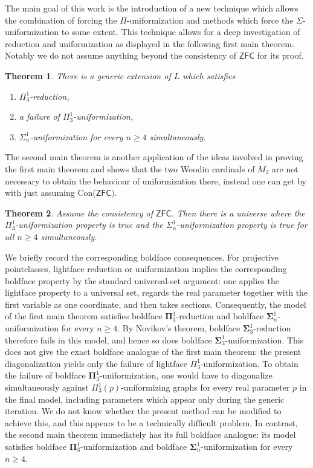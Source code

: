 \documentclass[a4paper,11pt]{article}
\newtheorem{theorem}{Theorem}[section]
\begin{document}
The main goal of this work is the introduction of a new technique which allows the combination of forcing the $\Pi$-uniformization and methods which force the $\Sigma$-uniformization to some extent. This technique allows for a deep investigation of reduction and uniformization as displayed in the following first main theorem. Notably we do not assume anything beyond the consistency of $\mathsf{ZFC}$ for its proof.


\begin{theorem}
There is a generic extension of $L$ which satisfies
\begin{enumerate}
\item $\Pi^1_3$-reduction,
\item a failure of $\Pi^1_3$-uniformization,
\item $\Sigma^1_n$-uniformization for every $n \ge 4$ simultaneously.
\end{enumerate}
\end{theorem}


The second main theorem is another application of the ideas involved in proving the first main theorem and shows that the two Woodin cardinals of $M_2$ are not necessary to obtain the behaviour of uniformization there, instead one can get by with just assuming Con($\mathsf{ZFC})$.


\begin{theorem}
Assume the consistency of $\mathsf{ZFC}$. Then there is a universe where the $\Pi^1_3$-uniformization property is true and the $\Sigma^1_n$-uniformization property is true for all $n \ge 4$ simultaneously.
\end{theorem}

We briefly record the corresponding boldface consequences. For projective pointclasses, lightface reduction or uniformization implies the corresponding boldface property by the standard universal-set argument: one applies the lightface property to a universal set, regards the real parameter together with the first variable as one coordinate, and then takes sections. Consequently, the model of the first main theorem satisfies boldface $\boldsymbol{\Pi}^1_3$-reduction and boldface $\boldsymbol{\Sigma}^1_n$-uniformization for every $n\geq4$. By Novikov's theorem, boldface $\boldsymbol{\Sigma}^1_3$-reduction therefore fails in this model, and hence so does boldface $\boldsymbol{\Sigma}^1_3$-uniformization. This does not give the exact boldface analogue of the first main theorem: the present diagonalization yields only the failure of lightface $\Pi^1_3$-uniformization. To obtain the failure of boldface $\boldsymbol{\Pi}^1_3$-uniformization, one would have to diagonalize simultaneously against $\Pi^1_3(p)$-uniformizing graphs for every real parameter $p$ in the final model, including parameters which appear only during the generic iteration. We do not know whether the present method can be modified to achieve this, and this appears to be a technically difficult problem. In contrast, the second main theorem immediately has its full boldface analogue: its model satisfies boldface $\boldsymbol{\Pi}^1_3$-uniformization and boldface $\boldsymbol{\Sigma}^1_n$-uniformization for every $n\geq4$.
\end{document}
